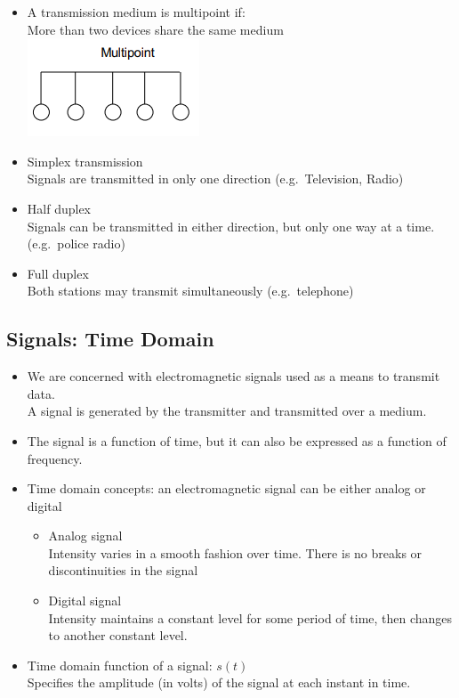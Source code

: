 \documentclass[11pt]{article}
\begin{document}
\begin{itemize}
    \item A transmission medium is multipoint if: \\
    More than two devices share the same medium \\
    \includegraphics[width=\textwidth]{multipoint}
    \item Simplex transmission \\
    Signals are transmitted in only one direction (e.g.\ Television, Radio)
    \item Half duplex \\
    Signals can be transmitted in either direction, but only one way at a time. (e.g.\ police radio)
    \item Full duplex \\
    Both stations may transmit simultaneously (e.g.\ telephone)
\end{itemize}
\subsection{Signals: Time Domain}
\begin{itemize}
    \item We are concerned with electromagnetic signals used as a means to transmit data. \\
    A signal is generated by the transmitter and transmitted over a medium.
    \item The signal is a function of time, but it can also be expressed as a function of frequency.
    \item Time domain concepts: an electromagnetic signal can be either analog or digital
    \begin{itemize}
        \item Analog signal \\
        Intensity varies in a smooth fashion over time. There is no breaks or discontinuities in the signal
        \item Digital signal \\
        Intensity maintains a constant level for some period of time, then changes to another constant level.
    \end{itemize}
    \item Time domain function of a signal: \( s(t) \) \\
    Specifies the amplitude (in volts) of the signal at each instant in time.
\end{itemize}
\end{document}
